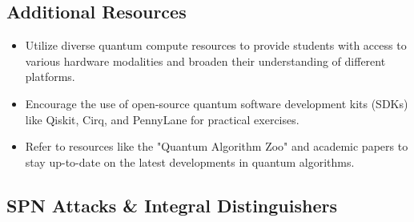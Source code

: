 \subsection{Additional Resources}

\begin{itemize}
    \item Utilize diverse quantum compute resources to provide students with access to various hardware modalities and broaden their understanding of different platforms.
    \item Encourage the use of open-source quantum software development kits (SDKs) like Qiskit, Cirq, and PennyLane for practical exercises.
    \item Refer to resources like the "Quantum Algorithm Zoo" and academic papers to stay up-to-date on the latest developments in quantum algorithms.
\end{itemize}


\subsection{SPN Attacks \& Integral Distinguishers}


